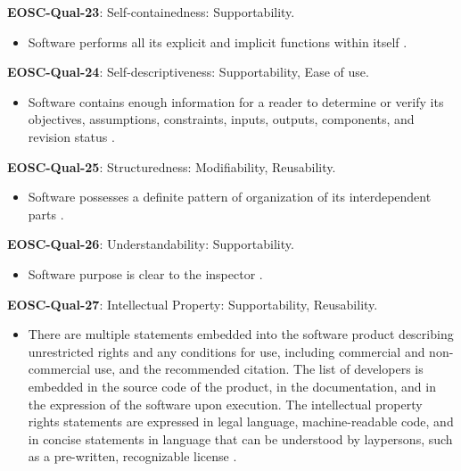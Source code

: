 \textbf{EOSC-Qual-23}: Self-containedness: Supportability.

\begin{itemize}
    \item Software performs all its explicit and implicit functions within itself \cite{boehm_quantitative_1976}.
\end{itemize}

\textbf{EOSC-Qual-24}: Self-descriptiveness: Supportability, Ease of use.

\begin{itemize}
    \item Software contains enough information for a reader to determine or verify its objectives, assumptions, constraints, inputs, outputs, components, and revision status \cite{boehm_quantitative_1976}.
\end{itemize}

\textbf{EOSC-Qual-25}: Structuredness: Modifiability, Reusability.

\begin{itemize}
    \item Software possesses a definite pattern of organization of its interdependent parts \cite{boehm_quantitative_1976}.
\end{itemize}

\textbf{EOSC-Qual-26}: Understandability: Supportability.

\begin{itemize}
    \item Software purpose is clear to the inspector \cite{boehm_quantitative_1976}.
\end{itemize}

\textbf{EOSC-Qual-27}: Intellectual Property: Supportability, Reusability.

\begin{itemize}
    \item There are multiple statements embedded into the software product describing unrestricted rights and any conditions for use, including commercial and non-commercial use, and the recommended citation. The list of developers is embedded in the source code of the product, in the documentation, and in the expression of the software upon execution. The intellectual property rights statements are expressed in legal language, machine-readable code, and in concise statements in language that can be understood by laypersons, such as a pre-written, recognizable license \cite{shepherdson_cessda_2019}.
\end{itemize}

